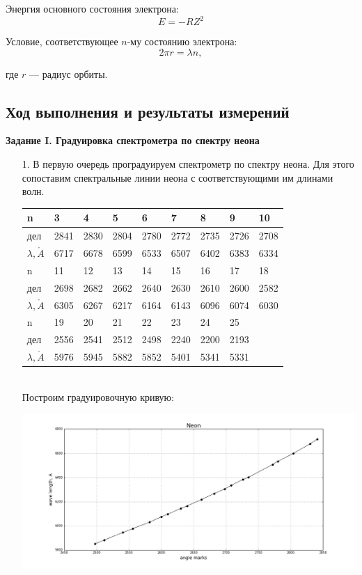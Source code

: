 \documentclass[12pt]{report}
\begin{document}
Энергия основного состояния электрона:
$$E = -RZ^2$$

Условие, соответствующее $n$-му состоянию электрона:
$$2\pi r = \lambda n,$$

где $r$ --- радиус орбиты.


\subsection*{Ход выполнения и результаты измерений}

\textbf{Задание I. Градуировка спектрометра по спектру неона}

\begin{enumerate}

\item[1.] В первую очередь проградуируем спектрометр по спектру неона.
Для этого сопоставим спектральные линии неона с соответствующими им
длинами волн.

{
    \centering
    \begin{tabularx}{0.937\textwidth}{|X|X|X|X|X|X|X|X|X|}
        \hline
        n & 3 & 4 & 5 & 6 & 7 & 8 & 9 & 10 \\
        \hline
        дел & 2841 & 2830 & 2804 & 2780 & 2772 & 2735 & 2726 & 2708 \\
        \hline
        $\lambda, \mathring{A}$ & 6717 & 6678 & 6599 & 6533 & 6507 & 6402 & 6383 & 6334 \\
        \hline
        \hline
        n & 11 & 12 & 13 & 14 & 15 & 16 & 17 & 18 \\
        \hline
        дел & 2698 & 2682 & 2662 & 2640 & 2630 & 2610 & 2600 & 2582 \\
        \hline
        $\lambda, \mathring{A}$ & 6305 & 6267 & 6217 & 6164 & 6143 & 6096 & 6074 & 6030 \\
        \hline
        \hline
        n & 19 & 20 & 21 & 22 & 23 & 24 & 25 & \\
        \hline
        дел & 2556 & 2541 & 2512 & 2498 & 2240 & 2200 & 2193 & \\
        \hline
        $\lambda, \mathring{A}$ & 5976 & 5945 & 5882 & 5852 & 5401 & 5341 & 5331 & \\
        \hline
    \end{tabularx}
}
\\

Построим градуировочную кривую:

\includegraphics[width=0.94 \textwidth]{g1_neon.png}



\end{enumerate}
\end{document}
